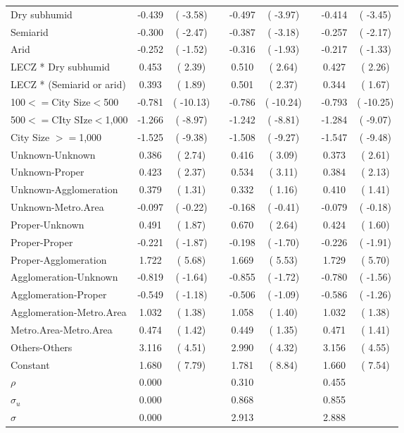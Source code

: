 \begin{center}
\begin{sidewaystable}
\begin{longtable}{lcccccccc}
Dry subhumid             & -0.439&(  -3.58)&& -0.497&(  -3.97)&& -0.414&(  -3.45)\\
Semiarid                 & -0.300&(  -2.47)&& -0.387&(  -3.18)&& -0.257&(  -2.17)\\
Arid                     & -0.252&(  -1.52)&& -0.316&(  -1.93)&& -0.217&(  -1.33)\\
LECZ * Dry subhumid      &  0.453&(   2.39)&&  0.510&(   2.64)&&  0.427&(   2.26)\\
LECZ * (Semiarid or arid)&  0.393&(   1.89)&&  0.501&(   2.37)&&  0.344&(   1.67)\\
100$<=$City Size$<$500   & -0.781&( -10.13)&& -0.786&( -10.24)&& -0.793&( -10.25)\\
500$<=$CIty SIze$<$1,000 & -1.266&(  -8.97)&& -1.242&(  -8.81)&& -1.284&(  -9.07)\\
City Size $>=$1,000      & -1.525&(  -9.38)&& -1.508&(  -9.27)&& -1.547&(  -9.48)\\
Unknown-Unknown          &  0.386&(   2.74)&&  0.416&(   3.09)&&  0.373&(   2.61)\\
Unknown-Proper           &  0.423&(   2.37)&&  0.534&(   3.11)&&  0.384&(   2.13)\\
Unknown-Agglomeration    &  0.379&(   1.31)&&  0.332&(   1.16)&&  0.410&(   1.41)\\
Unknown-Metro.Area       & -0.097&(  -0.22)&& -0.168&(  -0.41)&& -0.079&(  -0.18)\\
Proper-Unknown           &  0.491&(   1.87)&&  0.670&(   2.64)&&  0.424&(   1.60)\\
Proper-Proper            & -0.221&(  -1.87)&& -0.198&(  -1.70)&& -0.226&(  -1.91)\\
Proper-Agglomeration     &  1.722&(   5.68)&&  1.669&(   5.53)&&  1.729&(   5.70)\\
Agglomeration-Unknown    & -0.819&(  -1.64)&& -0.855&(  -1.72)&& -0.780&(  -1.56)\\
Agglomeration-Proper     & -0.549&(  -1.18)&& -0.506&(  -1.09)&& -0.586&(  -1.26)\\
Agglomeration-Metro.Area &  1.032&(   1.38)&&  1.058&(   1.40)&&  1.032&(   1.38)\\
Metro.Area-Metro.Area    &  0.474&(   1.42)&&  0.449&(   1.35)&&  0.471&(   1.41)\\
Others-Others            &  3.116&(   4.51)&&  2.990&(   4.32)&&  3.156&(   4.55)\\
Constant                 &  1.680&(   7.79)&&  1.781&(   8.84)&&  1.660&(   7.54)\\
$\rho$&  0.000&&&  0.310&&&  0.455&\\
$\sigma_u$&  0.000&&&  0.868&&&  0.855&\\
$\sigma$&  0.000&&&  2.913&&&  2.888&\\
 \hline
 \end{longtable}
 \end{sidewaystable}
 \end{center}
